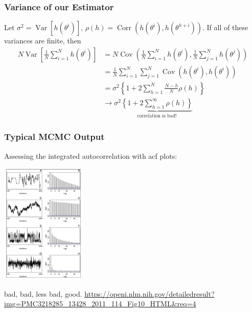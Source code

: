 \documentclass{beamer}
\begin{document}
\begin{frame}
\frametitle{Variance of our Estimator}

Let $\sigma^2 = \operatorname{Var}[h(\theta^i)]$, $\rho(h) = \operatorname{Corr}\left(  h(\theta^i), h(\theta^{h+i}) \right)$. If all of these variances are finite, then
\begin{align*}
N \operatorname{Var}\left[ \frac{1}{N}\sum_{i=1}^N h(\theta^i) \right] &= N\operatorname{Cov}\left( \frac{1}{N}\sum_{i=1}^N h(\theta^i),\frac{1}{N}\sum_{j=1}^N h(\theta^j) \right) \tag{defn.} \\
&= \frac{1}{N} \sum_{i=1}^N\sum_{j=1}^N\operatorname{Cov}\left(  h(\theta^i), h(\theta^i) \right) \tag{bilinearity} \\
&= \sigma^2 \left\{ 1 + 2\sum_{h=1}^N \frac{N - h}{N} \rho(h)\right\}  \tag{count diagonally} \\
&\to \sigma^2 \underbrace{\left\{ 1 + 2\sum_{h=1}^{\infty}  \rho(h)\right\}}_{\text{correlation is bad!}} 
\end{align*}



\end{frame}


\begin{frame}
\frametitle{Typical MCMC Output}

Assessing the integrated autocorrelation with acf plots:
\begin{center}
\includegraphics[width=40mm]{autocorr.png}
\end{center}
bad, bad, less bad, good.
\url{https://openi.nlm.nih.gov/detailedresult?img=PMC3218285_13428_2011_114_Fig10_HTML&req=4}

\end{frame}
\end{document}
